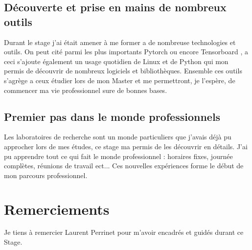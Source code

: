 \documentclass[11pt,francais]{article}
\begin{document}
\subsection{Découverte et prise en mains de nombreux outils}
Durant le stage j'ai était amener à me former a de nombreuse technologies et outils.
On peut cité parmi les plus importants Pytorch \cite{paszke2017automatic} ou encore Tensorboard \cite{tensorflow2015-whitepaper}, a ceci s'ajoute également un usage quotidien de Linux et de Python qui mon permis de découvrir de nombreux logiciels et bibliothèques.
Ensemble ces outils s'agrège a ceux étudier lors de mon Master et me permettront, je l'espère, de commencer ma vie professionnel sure de bonnes bases.

\subsection{Premier pas dans le monde professionnels}
Les laboratoires de recherche sont un monde particuliers que j'avais déjà pu approcher lors de mes études, ce stage ma permis de les découvrir en détails. J'ai pu apprendre tout ce qui fait le monde professionnel : horaires fixes, journée complètes, réunions de travail ect...
Ces nouvelles expériences forme le début de mon parcours professionnel.

\newpage


\section*{Remerciements}
Je tiens à remercier Laurent Perrinet pour m'avoir encadrés et guidés durant ce Stage.



\newpage
\end{document}
